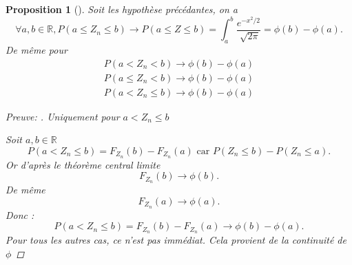 \documentclass{article}
\theoremstyle{plain}%
\newtheorem{prop}[thm]{Proposition}
\theoremstyle{definition}
\theoremstyle{remark}
\begin{document}
\begin{prop}[]
    Soit les hypothèse précédantes, on a 
    \[
        \forall a,b \in \mathbb{R}, P(a \leq Z_n \leq b) \to P(a \leq Z \leq b) = \int_{a}^{b}\frac{e^{-x^2 /2}}{\sqrt[]{2 \pi }} = \phi (b) - \phi (a)
    .\]
    De même pour \begin{align*}
        P(a < Z_n < b) \to \phi (b) - \phi (a) \\
        P(a \leq Z_n < b) \to \phi (b) - \phi (a) \\
        P(a < Z_n \leq  b) \to \phi (b) - \phi (a)
    \end{align*}

    \begin{proof}[Preuve: ]
        Uniquement pour $ a < Z_n \leq b $

        Soit $ a,b \in \mathbb{R} $ 
        \[
            P(a < Z_n \leq b) = F_{Z_n}(b) - F_{Z_n}(a) \text{ car } P(Z_n \leq b) - P(Z_n \leq a)
        .\]
        Or d'après le théorème central limite 
        \[
            F_{Z_n}(b) \to \phi (b)
        .\]
        De même 
        \[
            F_{Z_n}(a) \to \phi (a)
        .\]
        Donc : 
        \[
            P(a < Z_n \leq b) = F_{Z_n}(b) - F_{Z_n}(a) \to \phi(b)- \phi (a)
        .\]
        Pour tous les autres cas, ce n'est pas immédiat. Cela provient de la continuité de $ \phi  $ 
    \end{proof}
    
    
\end{prop}
\end{document}
